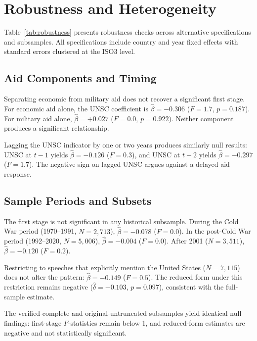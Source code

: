 \section{Robustness and Heterogeneity}\label{sec:robustness}



Table~\ref{tab:robustness} presents robustness checks across alternative specifications and subsamples. All specifications include country and year fixed effects with standard errors clustered at the ISO3 level.

\subsection{Aid Components and Timing}

Separating economic from military aid does not recover a significant first stage. For economic aid alone, the UNSC coefficient is $\hat{\beta} = -0.306$ ($F = 1.7$, $p = 0.187$). For military aid alone, $\hat{\beta} = +0.027$ ($F = 0.0$, $p = 0.922$). Neither component produces a significant relationship.

Lagging the UNSC indicator by one or two years produces similarly null results: UNSC at $t-1$ yields $\hat{\beta} = -0.126$ ($F = 0.3$), and UNSC at $t-2$ yields $\hat{\beta} = -0.297$ ($F = 1.7$). The negative sign on lagged UNSC argues against a delayed aid response.

\subsection{Sample Periods and Subsets}

The first stage is not significant in any historical subsample. During the Cold War period (1970--1991, $N=2{,}713$), $\hat{\beta} = -0.078$ ($F = 0.0$). In the post-Cold War period (1992--2020, $N=5{,}006$), $\hat{\beta} = -0.004$ ($F = 0.0$). After 2001 ($N=3{,}511$), $\hat{\beta} = -0.120$ ($F = 0.2$).

Restricting to speeches that explicitly mention the United States ($N=7{,}115$) does not alter the pattern: $\hat{\beta} = -0.149$ ($F = 0.5$). The reduced form under this restriction remains negative ($\hat{\delta} = -0.103$, $p = 0.097$), consistent with the full-sample estimate.

The verified-complete and original-untruncated subsamples yield identical null findings: first-stage $F$-statistics remain below 1, and reduced-form estimates are negative and not statistically significant.

